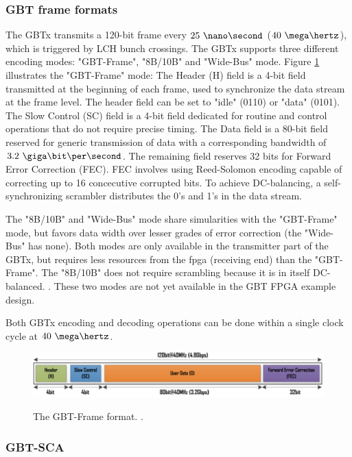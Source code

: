 \documentclass[main.tex]{subfiles}
\begin{document}
\subsubsection{GBT frame formats}
 The GBTx transmits a 120-bit frame every $25~\nano\second$ ($40~\mega\hertz$), which is triggered by LCH bunch crossings. The GBTx supports three different encoding modes: "GBT-Frame", "8B/10B" and "Wide-Bus" mode. Figure \ref{fig:gbtframe} illustrates the "GBT-Frame" mode: The Header (H) field is a 4-bit field transmitted at the beginning of each frame, used to synchronize the data stream at the frame level. The header field can be set to "idle" (0110) or "data" (0101). The Slow Control (SC) field is a 4-bit field dedicated for routine and control operations that do not require precise timing. The Data field is a 80-bit field reserved for generic transmission of data with a corresponding bandwidth of $3.2~\giga\bit\per\second$. The remaining field reserves 32 bits for Forward Error Correction (FEC). FEC involves using Reed-Solomon encoding capable of correcting up to 16 concecutive corrupted bits. To achieve DC-balancing, a self-synchronizing scrambler distributes the 0's and 1's in the data stream.

The "8B/10B" and "Wide-Bus" mode share simularities with the "GBT-Frame" mode, but favors data width over lesser grades of error correction (the "Wide-Bus" has none). Both modes are only available in the transmitter part of the GBTx, but requires less resources from the \gls{fpga} (receiving end) than the "GBT-Frame". The "8B/10B" does not require scrambling because it is in itself DC-balanced. \cite{gbtxman11}. These two modes are not yet available in the GBT FPGA example design.

Both GBTx encoding and decoding operations can be done within a single clock cycle at $40~\mega\hertz$. 
 
\begin{figure} %
\includegraphics[width=\linewidth]{../img/gbtframe}  \\[0.1 cm]
\caption{The GBT-Frame format. \cite[Figure 4]{gbt_fpga}.}
\label{fig:gbtframe}
\end{figure}

\subsubsection{GBT-SCA}
\end{document}
